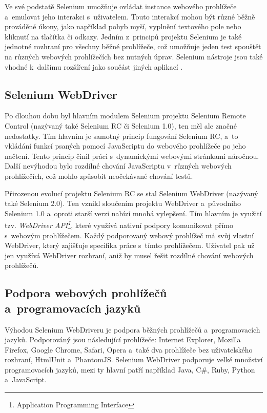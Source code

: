 \documentclass[
    color,   %
	table,   %
    twoside, %
    nolot, nolof,
]{fithesis3}
\begin{document}
Ve své podstatě Selenium umožňuje ovládat instance webového prohlížeče a~emulovat jeho interakci s~uživatelem. Touto interakcí mohou být různé běžně prováděné úkony, jako například pohyb myší, vyplnění textového pole nebo kliknutí na tlačítka či odkazy. Jedním z~principů projektu Selenium je také jednotné rozhraní pro všechny běžné prohlížeče, což umožňuje jeden test spouštět na různých webových prohlížečích bez nutných úprav. Selenium nástroje jsou také vhodné k~dalšímu rozšíření jako součást jiných aplikací \cite{SeleniumGithub}.

\subsection{Selenium WebDriver}
Po dlouhou dobu byl hlavním modulem Selenium projektu Selenium Remote Control (nazývaný také Selenium RC či Selenium 1.0), ten měl ale značné nedostatky. Tím hlavním je samotný princip fungování Selenium RC, a~to vkládání funkcí psaných pomocí JavaScriptu do webového prohlížeče po jeho načtení. Tento princip činil práci s~dynamickými webovými stránkami náročnou. Další nevýhodou bylo rozdílné chování JavaScriptu v~různých webových prohlížečích, což mohlo způsobit neočekávané chování testů.

Přirozenou evolucí projektu Selenium RC se stal Selenium WebDriver (nazývaný také Selenium 2.0). Ten vznikl sloučením projektu WebDriver a~původního Selenium 1.0 a~oproti starší verzi nabízí mnohá vylepšení. Tím hlavním je využití tzv. \emph{WebDriver API\footnote{Application Programming Interface}}, které využívá nativní podpory komunikovat přímo s~webovým prohlížečem. Každý podporovaný webový prohlížeč má svůj vlastní WebDriver, který zajišťuje specifika práce s~tímto prohlížečem. Uživatel pak už jen využívá WebDriver rozhraní, aniž by musel řešit rozdílné chování webových prohlížečů. 

\subsection*{Podpora webových prohlížečů a~programovacích jazyků}
Výhodou Selenium WebDriveru je podpora běžných prohlížečů a~programovacích jazyků. Podporováný jsou následující prohlížeče: Internet Explorer, Mozilla Firefox, Google Chrome, Safari, Opera a~také dva prohlížeče bez uživatelského rozhraní, HtmlUnit a~PhantomJS. Selenium WebDriver podporuje velké množství programovacích jazyků, mezi ty hlavní patří například Java, C\#, Ruby, Python a~JavaScript.
\end{document}
